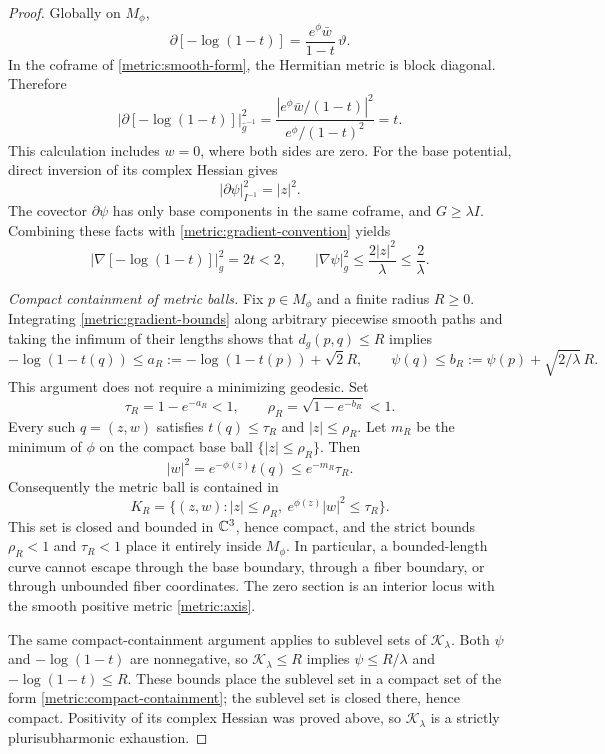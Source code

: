 \begin{proof}
Globally on $M_\phi$,
\[
 \partial[-\log(1-t)]
 =\frac{e^\phi\bar w}{1-t}\,\vartheta.
\]
In the coframe of \eqref{metric:smooth-form}, the Hermitian metric is
block diagonal.  Therefore
\[
 |\partial[-\log(1-t)]|_{\widehat g^{-1}}^2
 =\frac{|e^\phi\bar w/(1-t)|^2}{e^\phi/(1-t)^2}=t.
\]
This calculation includes $w=0$, where both sides are zero.  For the
base potential, direct inversion of its complex Hessian gives
\[
 |\partial\psi|_{I^{-1}}^2=|z|^2.
\]
The covector $\partial\psi$ has only base components in the same
coframe, and $G\ge\lambda I$.  Combining these facts with
\eqref{metric:gradient-convention} yields
\begin{equation}\label{metric:gradient-bounds}
 |\nabla[-\log(1-t)]|_g^2=2t<2,
 \qquad
 |\nabla\psi|_g^2\le\frac{2|z|^2}{\lambda}\le\frac2\lambda.
\end{equation}

\emph{Compact containment of metric balls.}
Fix $p\in M_\phi$ and a finite radius $R\ge0$.  Integrating
\eqref{metric:gradient-bounds} along arbitrary piecewise smooth paths
and taking the infimum of their lengths shows that
$d_g(p,q)\le R$ implies
\[
 -\log(1-t(q))\le a_R:=-\log(1-t(p))+\sqrt2R,
 \qquad
 \psi(q)\le b_R:=\psi(p)+\sqrt{2/\lambda}\,R.
\]
This argument does not require a minimizing geodesic.  Set
\[
 \tau_R=1-e^{-a_R}<1,\qquad
 \rho_R=\sqrt{1-e^{-b_R}}<1.
\]
Every such $q=(z,w)$ satisfies $t(q)\le\tau_R$ and
$|z|\le\rho_R$.  Let $m_R$ be the minimum of $\phi$ on the compact
base ball $\{|z|\le\rho_R\}$.  Then
\[
 |w|^2=e^{-\phi(z)}t(q)\le e^{-m_R}\tau_R.
\]
Consequently the metric ball is contained in
\begin{equation}\label{metric:compact-containment}
 K_R=\{(z,w):|z|\le\rho_R,
                  \ e^{\phi(z)}|w|^2\le\tau_R\}.
\end{equation}
This set is closed and bounded in $\mathbb C^3$, hence compact, and the
strict bounds $\rho_R<1$ and $\tau_R<1$ place it entirely inside
$M_\phi$.  In particular, a bounded-length curve cannot escape through
the base boundary, through a fiber boundary, or through unbounded fiber
coordinates.  The zero section is an interior locus with the smooth
positive metric \eqref{metric:axis}.

The same compact-containment argument applies to sublevel sets of
$\mathcal K_\lambda$.  Both $\psi$ and $-\log(1-t)$ are nonnegative,
so $\mathcal K_\lambda\le R$ implies
$\psi\le R/\lambda$ and $-\log(1-t)\le R$.  These bounds place the
sublevel set in a compact set of the form
\eqref{metric:compact-containment}; the sublevel set is closed there,
hence compact.  Positivity of its complex Hessian was proved above,
so $\mathcal K_\lambda$ is a strictly plurisubharmonic exhaustion.


\end{proof}

